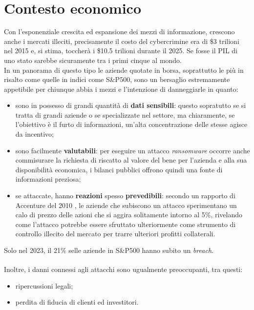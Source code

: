 \documentclass[12pt,a4paper,openright,twoside]{report}
\begin{document}
\section{Contesto economico}
Con l'esponenziale crescita ed espansione dei mezzi di informazione, crescono anche i mercati illeciti, precisamente il costo del cybercrimine era di \$3 trilioni nel 2015 e, si stima, toccher\`a i \$10.5 trilioni durante il 2025\cite{cybercrime_magazine}. Se fosse il PIL di uno stato sarebbe sicuramente tra i primi cinque al mondo.\\
In un panorama di questo tipo le aziende quotate in borsa, soprattutto le pi\`u in risalto come quelle in indici come S\&P500, sono un bersaglio estremamente appetibile per chiunque abbia i mezzi e l'intenzione di danneggiarle in quanto:
\begin{itemize}
  \setlength{\itemsep}{0pt}
  \setlength{\parskip}{0pt}       
  \renewcommand{\labelitemi}{\textbf{--}} 
  \item sono in possesso di grandi quantit\`a di \textbf{dati sensibili}: questo sopratutto se si tratta di grandi aziende o se specializzate nel settore, ma chiaramente, se l'obiettivo \`e il furto di informazioni, un'alta concentrazione delle stesse agisce da incentivo;
  \item sono facilmente \textbf{valutabili}: per eseguire un attacco \textit{ransomware} occorre anche commisurare la richiesta di riscatto al valore del bene per l'azienda e alla sua disponibilit\`a economica, i bilanci pubblici offrono quindi una fonte di informazioni  preziosa;
  \item se attaccate, hanno \textbf{reazioni} spesso \textbf{prevedibili}: secondo un rapporto di Accenture del 2010 \cite{accenture2010}, le aziende che subiscono un attacco sperimentano un calo di prezzo delle azioni che si aggira solitamente intorno al 5\%, rivelando come l'attacco potrebbe essere sfruttato ulteriormente come strumento di controllo illecito del mercato per trarre  ulteriori profitti collaterali.
\end{itemize}
Solo nel 2023, il 21\% selle aziende in S\&P500 hanno subito un \textit{breach}\cite{SecurityScorecard_SP500}.\\
\\
Inoltre, i danni connessi agli attacchi sono ugualmente preoccupanti, tra questi:
\begin{itemize}
  \setlength{\itemsep}{0pt}   
  \setlength{\parskip}{0pt}       
  \renewcommand{\labelitemi}{\textbf{--}}  
  \item ripercussioni legali;
  \item perdita di fiducia di clienti ed investitori.
\end{itemize}
\end{document}
